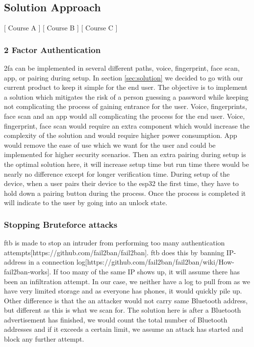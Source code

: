 \subsection{Solution Approach}
[ Course A ] [ Course B ] [ Course C ] 
\newline
\subsubsection{2 Factor Authentication}
\gls{2fa} can be implemented in several different paths, voice, fingerprint, face scan, app, or pairing during setup. In section \ref{sec:solution} we decided to go with our current product to keep it simple for the end user. The objective is to implement a solution which mitigates the risk of a person guessing a password while keeping not complicating the process of gaining entrance for the user. Voice, fingerprints, face scan and an app would all complicating the process for the end user. Voice, fingerprint, face scan would require an extra component which would increase the complexity of the solution and would require higher power consumption. App would remove the ease of use which we want for the user and could be implemented for higher security scenarios. Then an extra pairing during setup is the optimal solution here, it will increase setup time but run time there would be nearly no difference except for longer verification time. During setup of the device, when a user pairs their device to the esp32 the first time, they have to hold down a pairing button during the process. Once the process is completed it will indicate to the user by going into an unlock state.

\subsubsection{Stopping Bruteforce attacks}
\gls{ftb} is made to stop an intruder from performing too many authentication attempts[https://github.com/fail2ban/fail2ban]. \gls{ftb} does this by banning IP-address in a connection log[https://github.com/fail2ban/fail2ban/wiki/How-fail2ban-works]. If too many of the same IP shows up, it will assume there has been an infiltration attempt. In our case, we neither have a log to pull from as we have very limited storage and as everyone has phones, it would quickly pile up. Other difference is that the an attacker would not carry same Bluetooth address, but different as this is what we scan for. The solution here is after a Bluetooth advertisement has finished, we would count the total number of Bluetooth addresses and if it exceeds a certain limit, we assume an attack has started and block any further attempt.


